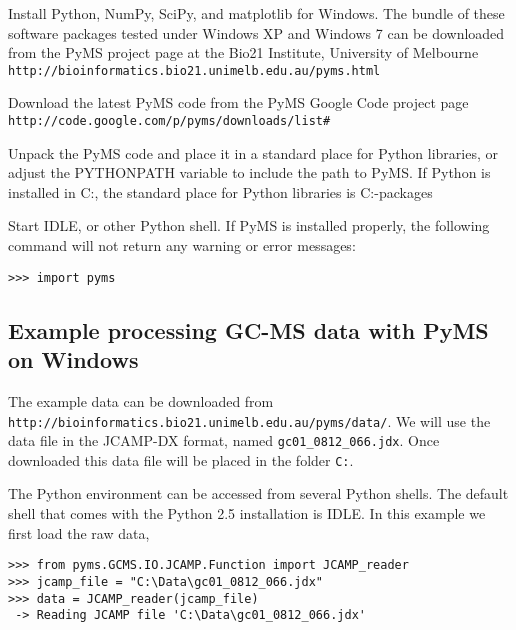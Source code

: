 \begin{enumarate}

\item Install Python, NumPy, SciPy, and matplotlib for Windows.
The bundle of these software packages tested under Windows XP and
Windows 7 can be downloaded from the PyMS project page at the
Bio21 Institute, University of Melbourne\\
{\tt http://bioinformatics.bio21.unimelb.edu.au/pyms.html}

\item Download the latest PyMS code from the PyMS Google Code
project page\\
{\tt http://code.google.com/p/pyms/downloads/list#}

\item Unpack the PyMS code and place it in a standard place for
Python libraries, or adjust the PYTHONPATH variable to include
the path to PyMS. If Python is installed in C:, the
standard place for Python libraries is C:\Libs\site-packages

\item Start IDLE, or other Python shell. If PyMS is installed
properly, the following command will not return any warning or
error messages:

\begin{verbatim}
>>> import pyms
\end{verbatim}

\end{enumarate}

\subsection{Example processing GC-MS data with PyMS on Windows}

The example data can be downloaded from\\
{\tt http://bioinformatics.bio21.unimelb.edu.au/pyms/data/}.
We will use the data file in the JCAMP-DX format, named
{\tt gc01\_0812\_066.jdx}. Once downloaded this data file
will be placed in the folder {\tt C:\Data}.

The Python environment can be accessed from several Python
shells. The default shell that comes with the Python 2.5
installation is IDLE. In this example we first load the
raw data,

\begin{verbatim}
>>> from pyms.GCMS.IO.JCAMP.Function import JCAMP_reader
>>> jcamp_file = "C:\Data\gc01_0812_066.jdx"
>>> data = JCAMP_reader(jcamp_file)
 -> Reading JCAMP file 'C:\Data\gc01_0812_066.jdx'
\end{verbatim}


